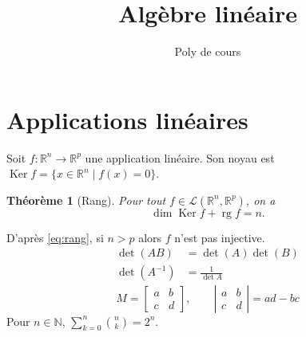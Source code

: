 \documentclass[11pt]{article}
\title{Algèbre linéaire}
\author{Poly de cours}
\newtheorem{theorem}{Théorème}
\newcommand{\R}{\mathbb{R}}
\newcommand{\N}{\mathbb{N}}
\DeclareMathOperator{\Ker}{Ker}
\begin{document}
\maketitle
\section{Applications linéaires}
Soit $f : \R^n \to \R^p$ une application linéaire. Son noyau est $\Ker f = \{x \in \R^n \mid f(x) = 0\}$.
\begin{theorem}[Rang]
Pour tout $f \in \mathcal{L}(\R^n, \R^p)$, on a
\begin{equation}\label{eq:rang}
\dim \Ker f + \operatorname{rg} f = n.
\end{equation}
\end{theorem}
D'après \eqref{eq:rang}, si $n > p$ alors $f$ n'est pas injective.
\begin{align}
\det(AB) &= \det(A)\det(B) \label{eq:det} \\
\det(A^{-1}) &= \frac{1}{\det A} \nonumber
\end{align}
\[
M = \begin{bmatrix} a & b \\ c & d \end{bmatrix}, \qquad
\left| \begin{matrix} a & b \\ c & d \end{matrix} \right| = ad - bc
\]
Pour $n \in \N$, $\displaystyle \sum_{k=0}^{n} \binom{n}{k} = 2^n$.
\end{document}
